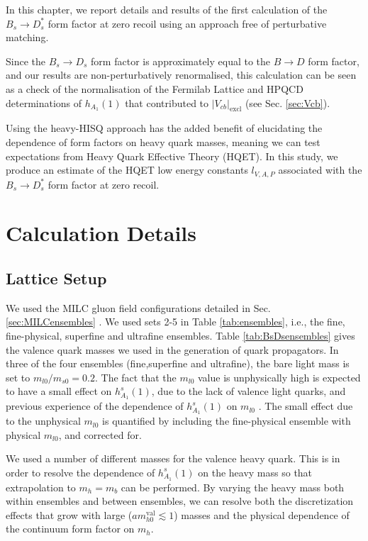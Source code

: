 In this chapter, we report details and results of the first calculation of the $B_s\to D^*_s$ form factor at zero recoil using an approach free of perturbative matching. 

Since the $B_s\to D_s$ form factor is approximately equal to the $B\to D$ form factor, and our results are non-perturbatively renormalised, this calculation can be seen as a check of the normalisation of the Fermilab Lattice and HPQCD determinations of $h_{A_1}(1)$ that contributed to $|V_{cb}|_{\text{excl}}$ (see Sec. \ref{sec:Vcb}). %

Using the heavy-HISQ approach has the added benefit of elucidating the dependence of form factors on heavy quark masses, meaning we can test expectations from Heavy Quark Effective Theory (HQET). In this study, we produce an estimate of the HQET low energy constants $l_{V,A,P}$ associated with the $B_s \to D_s^*$ form factor at zero recoil.

\section{Calculation Details}
\label{sec:BsDsstar_deets}

\subsection{Lattice Setup}

We used the MILC gluon field configurations detailed in Sec. \ref{sec:MILCensembles} \cite{Bazavov:2010ru,Bazavov:2012xda}. We used sets 2-5 in Table \ref{tab:ensembles}, i.e., the fine, fine-physical, superfine and ultrafine ensembles. Table \ref{tab:BsDsensembles} gives the valence quark masses we used in the generation of quark propagators. In three of the four ensembles (fine,superfine and ultrafine), the bare light mass is set to $m_{l0}/m_{s0} = 0.2$. The fact that the $m_{l0}$ value is unphysically high is expected to have a small effect on $h^s_{A_1}(1)$, due to the lack of valence light quarks, and previous experience of the dependence of $h_{A_1}^s(1)$ on $m_{l0}$ \cite{Harrison:2017fmw}. The small effect due to the unphysical $m_{l0}$ is quantified by including the fine-physical ensemble with physical $m_{l0}$, and corrected for.

We used a number of different masses for the valence heavy quark. This is in order to resolve the dependence of $h_{A_1}^s(1)$ on the heavy mass so that extrapolation to $m_h=m_b$ can be performed. By varying the heavy mass both within ensembles and between ensembles, we can resolve both the discretization effects that grow with large ($am^{\text{val}}_{h0} \lesssim 1$) masses and the physical dependence of the continuum form factor on $m_h$.

